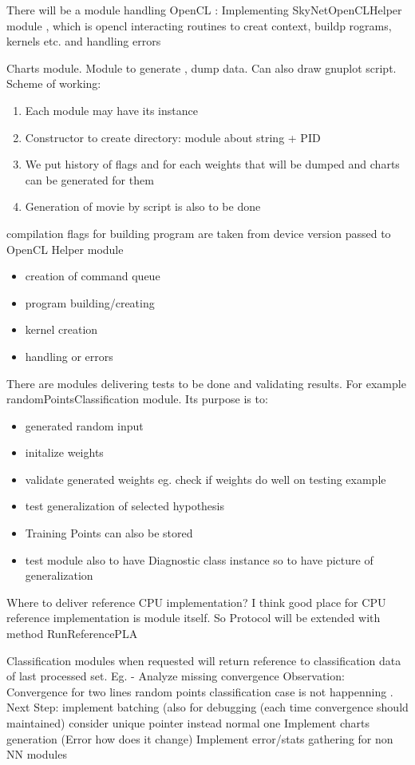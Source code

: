 \documentclass[a4paper,10pt]{article}
\begin{document}
There will be a module handling OpenCL :
Implementing SkyNetOpenCLHelper module , which is opencl interacting routines to creat context, buildp rograms, kernels etc. and handling errors


Charts module. Module to generate , dump data. Can also draw gnuplot script.
Scheme of working:
\begin{enumerate}
\item Each module may have its instance
\item Constructor to create directory: module about string + PID
\item We put history of flags and for each weights that will be dumped and charts can be generated for them
\item Generation of movie by script is also to be done
\end{enumerate}

compilation flags for building program are taken from device version passed to OpenCL Helper module




\begin{itemize}
\item creation of command queue
\item program building/creating
\item kernel creation
\item handling or errors
\end{itemize}

There are modules delivering tests to be done and validating results.
For example randomPointsClassification module. Its purpose is to:
\begin{itemize}
\item generated random input
\item initalize weights
\item validate generated weights eg. check if weights do well on testing example
\item test generalization of selected hypothesis 
\item Training Points can also be stored
\item test module also to have Diagnostic class instance so to have picture of generalization
\end{itemize}

Where to deliver reference CPU implementation? I think good place for CPU reference implementation is module itself.
So Protocol will be extended with method RunReferencePLA

Classification modules when requested will return reference to classification data of last processed set. Eg.
- Analyze missing convergence
Observation:
Convergence for two lines random points classification case is not happenning .
Next Step:
implement batching (also for debugging (each time convergence should maintained)
consider unique pointer instead normal one
Implement charts generation (Error how does it change) 
Implement error/stats gathering for non NN modules
\end{document}
